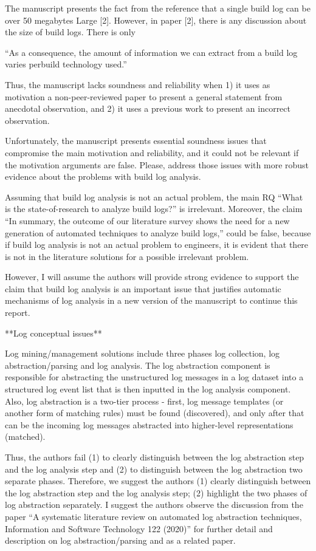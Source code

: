 \documentclass[10pt,a4wide]{article}
\renewenvironment{leftbar}{%
	\vspace{0.1cm}
	\def\FrameCommand{\vrule width 0.4pt \hspace{15pt}}%
	\MakeFramed {\advance\hsize-\width \FrameRestore}}%
{\endMakeFramed\vspace{0.1cm}}
\begin{document}
\begin{leftbar}
The manuscript presents the fact from the reference that a single build log can be over 50 megabytes Large [2]. However, in paper [2], there is any discussion about the size of build logs. There is only

“As a consequence, the amount of information we can extract from a build log varies perbuild technology used.”

Thus, the manuscript lacks soundness and reliability when 1) it uses as motivation a non-peer-reviewed paper to present a general statement from anecdotal observation, and 2) it uses a previous work to present an incorrect observation.


Unfortunately, the manuscript presents essential soundness issues that compromise the main motivation and reliability, and it could not be relevant if the motivation arguments are false.  Please, address those issues with more robust evidence about the problems with build log analysis.


Assuming that build log analysis is not an actual problem, the main RQ  “What is the state-of-research to analyze build logs?” is irrelevant. Moreover, the claim “In summary, the outcome of our literature survey shows the need for a new generation of automated techniques to analyze build logs,” could be false, because if build log analysis is not an actual problem to engineers, it is evident that there is not in the literature solutions for a possible irrelevant problem.


However, I will assume the authors will provide strong evidence to support the claim that build log analysis is an important issue that justifies automatic mechanisms of log analysis in a new version of the manuscript to continue this report.


**Log conceptual issues**

Log mining/management solutions include three phases log collection, log abstraction/parsing and log analysis. The log abstraction component is responsible for abstracting the unstructured log messages in a log dataset into a structured log event list that is then inputted in the log analysis component. Also, log abstraction is a two-tier process - first, log message templates (or another form of matching rules) must be found (discovered), and only after that can be the incoming log messages abstracted into higher-level representations (matched).

Thus, the authors fail (1) to clearly distinguish between the log abstraction step and the log analysis step and (2)  to distinguish between the log abstraction two separate phases.  Therefore, we suggest the authors (1) clearly distinguish between the log abstraction step and the log analysis step; (2)  highlight the two phases of log abstraction separately. I suggest the authors observe the discussion from the paper “A systematic literature review on automated log abstraction techniques, Information and Software Technology 122 (2020)”  for further detail and description on log abstraction/parsing and as a related paper.


\end{leftbar}
\end{document}
